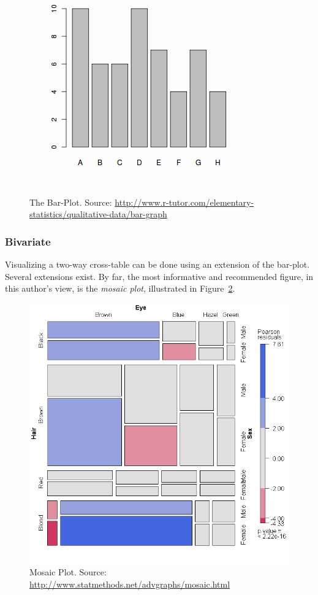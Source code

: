 \documentclass[12pt,a4paper]{report}
\begin{document}
\begin{figure}[h]
\centering
\includegraphics[height=0.3\textheight]{art/categorical-data1x}
\caption[Bar Plot]{The Bar-Plot. Source: \url{http://www.r-tutor.com/elementary-statistics/qualitative-data/bar-graph}}
\label{fig:barplot}
\end{figure}



\subsubsection{Bivariate}
Visualizing a two-way cross-table can be done using an extension of the bar-plot.
Several extensions exist. By far, the most informative and recommended figure, in this author's view, is the \emph{mosaic plot}, illustrated in Figure~\ref{fig:mosaic}. 

\begin{figure}[h]
\centering
\includegraphics[height=0.3\textheight]{art/mosaic1}
\caption[Mosaic Plot]{Mosaic Plot. Source: \url{http://www.statmethods.net/advgraphs/mosaic.html}}
\label{fig:mosaic}
\end{figure}
\end{document}
